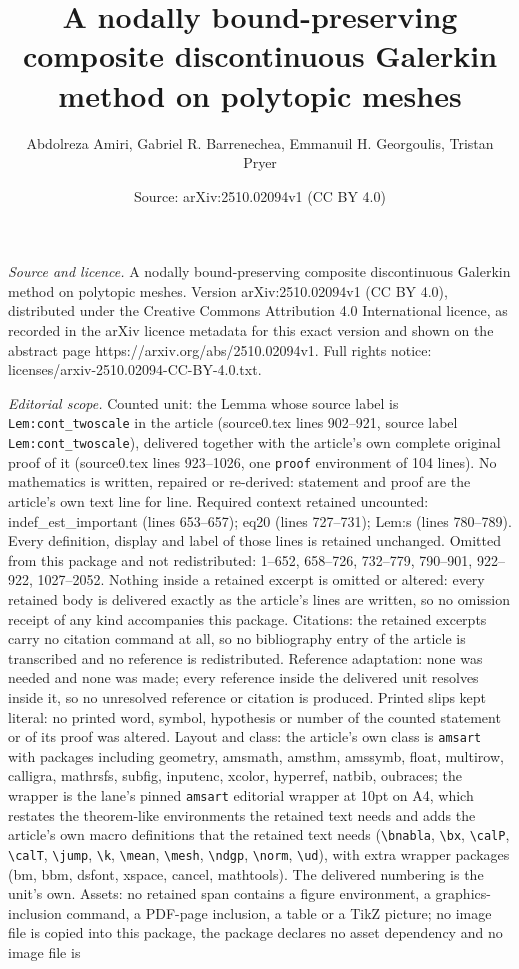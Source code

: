 \documentclass[10pt,a4paper]{amsart}
\title[A nodally bound-preserving composite discontinuous Galerkin ]{A nodally bound-preserving composite discontinuous Galerkin method on polytopic meshes}
\author{Abdolreza Amiri, Gabriel R. Barrenechea, Emmanuil H. Georgoulis, Tristan Pryer}
\date{Source: arXiv:2510.02094v1 (CC BY 4.0)}
\begin{document}
\maketitle

\noindent\emph{Source and licence.} A nodally bound-preserving composite discontinuous Galerkin method on polytopic meshes. Version arXiv:2510.02094v1 (CC BY 4.0), distributed under the Creative Commons Attribution 4.0 International licence, as recorded in the arXiv licence metadata for this exact version and shown on the abstract page https://arxiv.org/abs/2510.02094v1. Full rights notice: licenses/arxiv-2510.02094-CC-BY-4.0.txt.\par\smallskip

\noindent\textit{Editorial scope.} Counted unit: the Lemma whose source label is \texttt{Lem:cont\_twoscale} in the article (source0.tex lines 902--921, source label \texttt{Lem:cont\_twoscale}), delivered together with the article's own complete original proof of it (source0.tex lines 923--1026, one \texttt{proof} environment of 104 lines). No mathematics is written, repaired or re-derived: statement and proof are the article's own text line for line. Required context retained uncounted: indef\_est\_important (lines 653--657); eq20 (lines 727--731); Lem:s (lines 780--789). Every definition, display and label of those lines is retained unchanged. Omitted from this package and not redistributed: 1--652, 658--726, 732--779, 790--901, 922--922, 1027--2052. Nothing inside a retained excerpt is omitted or altered: every retained body is delivered exactly as the article's lines are written, so no omission receipt of any kind accompanies this package. Citations: the retained excerpts carry no citation command at all, so no bibliography entry of the article is transcribed and no reference is redistributed. Reference adaptation: none was needed and none was made; every reference inside the delivered unit resolves inside it, so no unresolved reference or citation is produced. Printed slips kept literal: no printed word, symbol, hypothesis or number of the counted statement or of its proof was altered. Layout and class: the article's own class is \texttt{amsart} with packages including geometry, amsmath, amsthm, amssymb, float, multirow, calligra, mathrsfs, subfig, inputenc, xcolor, hyperref, natbib, oubraces; the wrapper is the lane's pinned \texttt{amsart} editorial wrapper at 10pt on A4, which restates the theorem-like environments the retained text needs and adds the article's own macro definitions that the retained text needs (\texttt{\textbackslash bnabla}, \texttt{\textbackslash bx}, \texttt{\textbackslash calP}, \texttt{\textbackslash calT}, \texttt{\textbackslash jump}, \texttt{\textbackslash k}, \texttt{\textbackslash mean}, \texttt{\textbackslash mesh}, \texttt{\textbackslash ndgp}, \texttt{\textbackslash norm}, \texttt{\textbackslash ud}), with extra wrapper packages (bm, bbm, dsfont, xspace, cancel, mathtools). The delivered numbering is the unit's own. Assets: no retained span contains a figure environment, a graphics-inclusion command, a PDF-page inclusion, a table or a TikZ picture; no image file is copied into this package, the package declares no asset dependency and no image file is 
\end{document}
